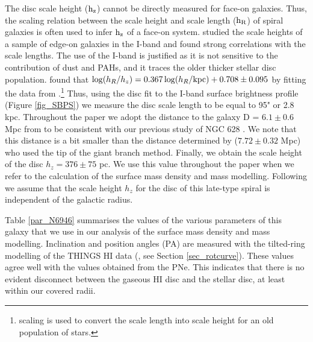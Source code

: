 \documentclass[fleqn,usenatbib]{mnras}
\begin{document}
The disc scale height ($\rm h_{z}$) cannot be directly measured for face-on galaxies. Thus, the scaling relation between the scale height and scale length ($\rm h_{R}$) of spiral galaxies is often used to infer $\rm h_{z}$ of a face-on system. \citet{Kregel:02} studied the scale heights of a sample of edge-on galaxies in the I-band and found strong correlations with the scale lengths. The use of the I-band is justified as it is not sensitive to the contribution of dust and PAHs, %
and it traces the older thicker stellar disc population. %
\citet{Bershady:10b} found that $\log(h_R / h_z) = 0.367\log(h_R/{\rm kpc}) + 0.708 \pm 0.095$ by fitting the data from \citet{Kregel:02}.\footnote{\citet{Bershady:10b} scaling is used to convert the scale length into scale height for an old population of stars.} Thus, using the disc fit to the I-band surface brightness profile (Figure \ref{fig_SBPS}) we measure the disc scale length to be equal to 95" or 2.8 kpc. Throughout the paper we adopt %
the distance to the galaxy D = $6.1 \pm 0.6$ Mpc from \citet{HC1} to be consistent with our previous study of NGC 628 .
We note that this distance is a bit smaller than the distance determined by \citet{anand18} ($7.72 \pm 0.32$ Mpc) who used the tip of the giant branch method. Finally, we obtain the scale height of the disc $h_z = 376 \pm 75$ pc. We use this value throughout the paper when we refer to the calculation of the surface mass density and mass modelling. Following \citet{degrijs97} we assume that the scale height $h_z$ for the disc of this late-type spiral is independent of the galactic radius. 

Table \ref{par_N6946} summarises the values of the various parameters of this galaxy that we use in our analysis of the surface mass density and mass modelling. 
Inclination and position angles (PA) are measured with the tilted-ring modelling of the THINGS HI data (\citealt{things}, see Section \ref{sec_rotcurve}).
These values  agree well with the values obtained from the PNe. This indicates that there is no evident disconnect between the gaseous HI disc and the stellar disc, at least within our covered radii. 
\end{document}
